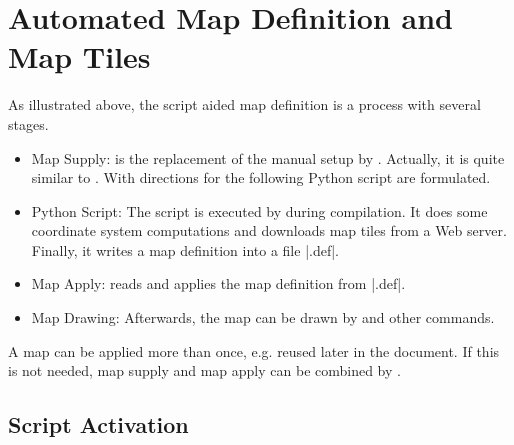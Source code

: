 \clearpage
\section{Automated Map Definition and Map Tiles}\label{sec:automated_map}%

\begin{center}
\end{center}

As illustrated above, the script aided map definition is a process with
several stages.

\begin{itemize}
\item Map Supply:  is the replacement of the manual setup by
  . Actually, it is quite similar to .
  With  directions for the following Python script
  are formulated.
\item Python Script: The script is executed by  during
  compilation. It does some coordinate system computations and downloads
  map tiles from a Web server. Finally, it writes a map definition into
  a file |.def|.
\item Map Apply:  reads and applies the
  map definition from |.def|.
\item Map Drawing: Afterwards, the map can be drawn by 
  and other commands.
\end{itemize}

A map can be applied more than once, e.g. reused later in the document.
If this is not needed, map supply and map apply can be combined by
.


\subsection{Script Activation}

